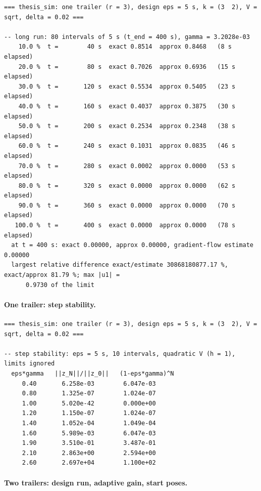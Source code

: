 {\scriptsize\begin{verbatim}
=== thesis_sim: one trailer (r = 3), design eps = 5 s, k = (3  2), V = sqrt, delta = 0.02 ===

-- long run: 80 intervals of 5 s (t_end = 400 s), gamma = 3.2028e-03
    10.0 %  t =        40 s  exact 0.8514  approx 0.8468   (8 s elapsed)
    20.0 %  t =        80 s  exact 0.7026  approx 0.6936   (15 s elapsed)
    30.0 %  t =       120 s  exact 0.5534  approx 0.5405   (23 s elapsed)
    40.0 %  t =       160 s  exact 0.4037  approx 0.3875   (30 s elapsed)
    50.0 %  t =       200 s  exact 0.2534  approx 0.2348   (38 s elapsed)
    60.0 %  t =       240 s  exact 0.1031  approx 0.0835   (46 s elapsed)
    70.0 %  t =       280 s  exact 0.0002  approx 0.0000   (53 s elapsed)
    80.0 %  t =       320 s  exact 0.0000  approx 0.0000   (62 s elapsed)
    90.0 %  t =       360 s  exact 0.0000  approx 0.0000   (70 s elapsed)
   100.0 %  t =       400 s  exact 0.0000  approx 0.0000   (78 s elapsed)
  at t = 400 s: exact 0.00000, approx 0.00000, gradient-flow estimate 0.00000
  largest relative difference exact/estimate 30868180877.17 %, exact/approx 81.79 %; max |u1| =
      0.9730 of the limit
\end{verbatim}}

\paragraph{One trailer: step stability.}

{\scriptsize\begin{verbatim}
=== thesis_sim: one trailer (r = 3), design eps = 5 s, k = (3  2), V = sqrt, delta = 0.02 ===

-- step stability: eps = 5 s, 10 intervals, quadratic V (h = 1), limits ignored
  eps*gamma   ||z_N||/||z_0||   (1-eps*gamma)^N
     0.40       6.258e-03        6.047e-03
     0.80       1.325e-07        1.024e-07
     1.00       5.020e-42        0.000e+00
     1.20       1.150e-07        1.024e-07
     1.40       1.052e-04        1.049e-04
     1.60       5.989e-03        6.047e-03
     1.90       3.510e-01        3.487e-01
     2.10       2.863e+00        2.594e+00
     2.60       2.697e+04        1.100e+02
\end{verbatim}}

\paragraph{Two trailers: design run, adaptive gain, start poses.}

